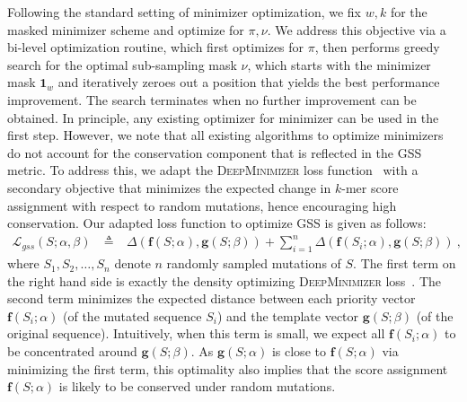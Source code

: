 \label{sec:optimize}
Following the standard setting of minimizer optimization, we fix $w,k$ for the masked minimizer scheme and optimize for $\pi,\nu$. We address this objective via a bi-level optimization routine, which first optimizes for $\pi$, then performs greedy search for the optimal sub-sampling mask $\nu$, which starts with the minimizer mask $\mathbf{1}_w$ and iteratively zeroes out a position that yields the best performance improvement. The search terminates when no further improvement can be obtained. In principle, any existing optimizer for minimizer \cite{ekim20pasha,zheng20miniception,zheng21,hoang2022deepminimizer} can be used in the first step. However, we note that all existing algorithms to optimize minimizers do not account for the conservation component that is reflected in the GSS metric. To address this, we adapt the \textsc{DeepMinimizer} loss function~\cite{hoang2022deepminimizer} 
with a secondary objective that minimizes the expected change in $k$-mer score assignment with respect to random mutations, hence encouraging high conservation. Our adapted loss function to optimize GSS is given as follows:
\begin{eqnarray}
\mathcal{L}_{gss}(S; \alpha, \beta) \ &\triangleq& \ \Delta(\mathbf{f}(S;\alpha), \mathbf{g}(S;\beta)) + \sum_{i=1}^n \Delta(\mathbf{f}(S_i; \alpha), \mathbf{g}(S; \beta)) \ ,
\label{eq:loss}
\end{eqnarray}
where $S_1, S_2, \dots , S_n$ denote $n$ randomly sampled mutations of $S$. The first term on the right hand side is exactly the density optimizing \textsc{DeepMinimizer} loss~\cite{hoang2022deepminimizer}. The second term minimizes the expected distance between each priority vector $\mathbf{f}(S_i; \alpha)$ (of the mutated sequence $S_i$) and the template vector $\mathbf{g}(S; \beta)$ (of the original sequence). Intuitively, when this term is small, we expect all $\mathbf{f}(S_i; \alpha)$ to be concentrated around $\mathbf{g}(S; \beta)$. As $\mathbf{g}(S; \alpha)$ is close to $\mathbf{f}(S; \alpha)$ via minimizing the first term, this optimality also implies that the score assignment $\mathbf{f}(S; \alpha)$ is likely to be conserved under random mutations. 
